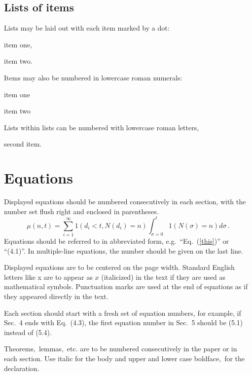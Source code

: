 \documentclass{ws-m3as}
\begin{document}
\subsection{Lists of items}

Lists may be laid out with each item marked by a dot:
\begin{itemlist}
 \item item one,
 \item item two.
\end{itemlist}

Items may also be numbered in lowercase roman numerals:
\begin{romanlist}[(ii)]
\item item one
\item item two
\begin{romanlist}[(b)]
\item Lists within lists can be numbered with lowercase roman letters,
\item second item.
\end{romanlist}
\end{romanlist}

\section{Equations}
Displayed equations should be numbered consecutively in each
section, with the number set flush right and enclosed in
parentheses.
\begin{equation}
\mu(n, t) = {\sum^\infty_{i=1} 1(d_i < t,
N(d_i) = n)}{\int^t_{\sigma=0} 1(N(\sigma) = n)d\sigma}\, .\label{this}
\end{equation}
Equations should be referred to in abbreviated form,
e.g.~``Eq.~(\ref{this})'' or ``(4.1)''. In multiple-line
equations, the number should be given on the last line.

Displayed equations are to be centered on the page width.  Standard
English\break
letters like x are to appear as $x$ (italicized) in the text
if they are used as mathematical symbols. Punctuation marks are used
at the end of equations as if they appeared directly in the text.

Each section should start with a fresh set of equation numbers, for
example, if Sec.~4 ends with Eq.~(4.3), the first equation number in
Sec.~5 should be (5.1) instead of (5.4).

\begin{theorem}\label{thm1}
Theorems$,$ lemmas$,$ etc. are to be numbered
consecutively in the paper or in each section. Use italic for the
body and upper and lower case boldface$,$ for the declaration.
\end{theorem}
\end{document}
